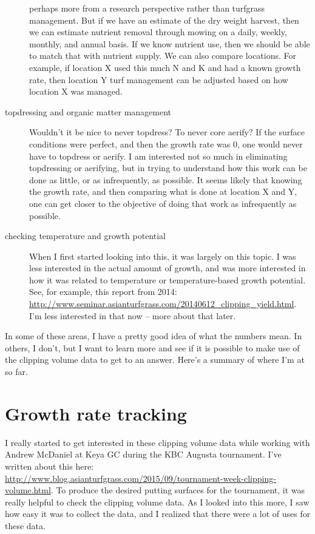 \documentclass[12pt,b5,]{tufte-book}
\begin{document}
\begin{description}
perhaps more from a research perspective rather than
turfgrass management. But if we have an estimate of the dry weight
harvest, then we can estimate nutrient removal through mowing on a
daily, weekly, monthly, and annual basis. If we know nutrient use,
then we should be able to match that with nutrient supply. We can
also compare locations. For example, if location X used this much N
and K and had a known growth rate, then location Y turf management
can be adjusted based on how location X was managed.
\item[topdressing and organic matter management]
Wouldn't it be nice to never topdress? To never core aerify? If the
surface conditions were perfect, and then the growth rate was 0, one
would never have to topdress or aerify. I am interested not so much
in eliminating topdressing or aerifying, but in trying to understand
how this work can be done as little, or as infrequently,
as possible. It seems likely that knowing the growth rate, and then
comparing what is done at location X and Y, one can get closer to
the objective of doing that work as infrequently as possible.
\item[checking temperature and growth potential]
When I first started looking into this, it was largely on
this topic. I was less interested in the actual amount of growth,
and was more interested in how it was related to temperature or
temperature-based growth potential. See, for example, this report
from 2014:
\url{http://www.seminar.asianturfgrass.com/20140612_clipping_yield.html}.
I'm less interested in that now -- more about that later.
\end{description}

In some of these areas, I have a pretty good idea of what the numbers
mean. In others, I don't, but I want to learn more and see if it is
possible to make use of the clipping volume data to get to an answer.
Here's a summary of where I'm at so far.

\hypertarget{growth-rate-tracking}{%
\section{Growth rate tracking}\label{growth-rate-tracking}}

I really started to get interested in these clipping volume data while
working with Andrew McDaniel at Keya GC during the KBC Augusta
tournament. I've written about this here:
\url{http://www.blog.asianturfgrass.com/2015/09/tournament-week-clipping-volume.html}.
To produce the desired putting surfaces for the tournament, it was
really helpful to check the clipping volume data. As I looked into this
more, I saw how easy it was to collect the data, and I realized that
there were a lot of uses for these data.
\end{document}
